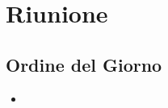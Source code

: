 \section{Riunione}
\subsection{Ordine del Giorno}
\begin{itemize}
	\item 

\end{itemize}

\subsection{}
\subsubsection{}

\clearpage
